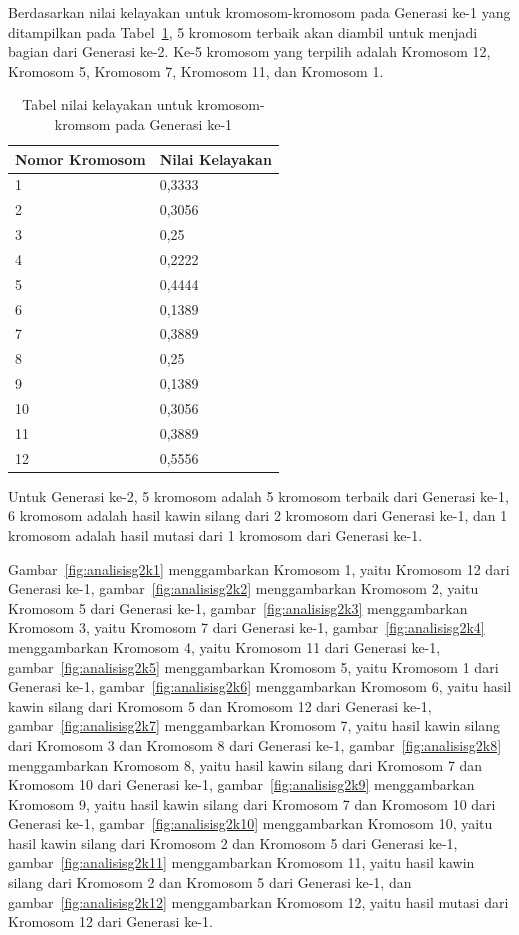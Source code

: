 \clearpage

Berdasarkan nilai kelayakan untuk kromosom-kromosom pada Generasi ke-1 yang ditampilkan pada Tabel~\ref{tab:analisishg2}, 5 kromosom terbaik akan diambil untuk menjadi bagian dari Generasi ke-2. Ke-5 kromosom yang terpilih adalah Kromosom 12, Kromosom 5, Kromosom 7, Kromosom 11, dan Kromosom 1.

\begin{table}
\centering
\captionsetup{justification=centering}
\caption[Tabel nilai kelayakan untuk kromosom-kromsom pada Generasi ke-1]{Tabel nilai kelayakan untuk kromosom-kromsom pada Generasi ke-1}
\begin{tabular}{| l | l |}
\hline
Nomor Kromosom & Nilai Kelayakan \\
\hline \hline
1 & 0,3333 \\
\hline
2 & 0,3056 \\
\hline
3 & 0,25 \\
\hline
4 & 0,2222 \\
\hline
5 & 0,4444 \\
\hline
6 & 0,1389 \\
\hline
7 & 0,3889 \\
\hline
8 & 0,25 \\
\hline
9 & 0,1389 \\
\hline
10 & 0,3056 \\
\hline
11 & 0,3889 \\
\hline
12 & 0,5556 \\
\hline
\end{tabular}
\label{tab:analisishg2}
\end{table}

Untuk Generasi ke-2, 5 kromosom adalah 5 kromosom terbaik dari Generasi ke-1, 6 kromosom adalah hasil kawin silang dari 2 kromosom dari Generasi ke-1, dan 1 kromosom adalah hasil mutasi dari 1 kromosom dari Generasi ke-1.

Gambar~\ref{fig:analisisg2k1} menggambarkan Kromosom 1, yaitu Kromosom 12 dari Generasi ke-1, gambar~\ref{fig:analisisg2k2} menggambarkan Kromosom 2, yaitu Kromosom 5 dari Generasi ke-1, gambar~\ref{fig:analisisg2k3} menggambarkan Kromosom 3, yaitu Kromosom 7 dari Generasi ke-1, gambar~\ref{fig:analisisg2k4} menggambarkan Kromosom 4, yaitu Kromosom 11 dari Generasi ke-1, gambar~\ref{fig:analisisg2k5} menggambarkan Kromosom 5, yaitu Kromosom 1 dari Generasi ke-1, gambar~\ref{fig:analisisg2k6} menggambarkan Kromosom 6, yaitu hasil kawin silang dari Kromosom 5 dan Kromosom 12 dari Generasi ke-1, gambar~\ref{fig:analisisg2k7} menggambarkan Kromosom 7, yaitu hasil kawin silang dari Kromosom 3 dan Kromosom 8 dari Generasi ke-1, gambar~\ref{fig:analisisg2k8} menggambarkan Kromosom 8, yaitu hasil kawin silang dari Kromosom 7 dan Kromosom 10 dari Generasi ke-1, gambar~\ref{fig:analisisg2k9} menggambarkan Kromosom 9, yaitu hasil kawin silang dari Kromosom 7 dan Kromosom 10 dari Generasi ke-1, gambar~\ref{fig:analisisg2k10} menggambarkan Kromosom 10, yaitu hasil kawin silang dari Kromosom 2 dan Kromosom 5 dari Generasi ke-1, gambar~\ref{fig:analisisg2k11} menggambarkan Kromosom 11, yaitu hasil kawin silang dari Kromosom 2 dan Kromosom 5 dari Generasi ke-1, dan gambar~\ref{fig:analisisg2k12} menggambarkan Kromosom 12, yaitu hasil mutasi dari Kromosom 12 dari Generasi ke-1.

